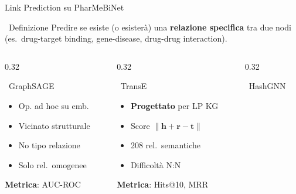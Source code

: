 \documentclass[aspectratio=169]{beamer}
\newcommand{\icoLink}{\faLink}
\newcommand{\icoCheck}{\faCheckCircle}
\newcommand{\icoX}{\faTimesCircle}
\newcommand{\icoLink}{\ding{212}}
\newcommand{\icoCheck}{\ding{52}}
\newcommand{\icoX}{\ding{56}}
\newcommand{\pro}{{\color{successGreen}\icoCheck}}
\newcommand{\con}{{\color{warningRed}\icoX}}
\newcommand{\neu}{{\color{unigold}$\sim$}}
\begin{document}
\begin{frame}{Link Prediction su PharMeBiNet}
  \begin{block}{\icoLink\ Definizione}
    \small
    Predire se esiste (o esister\`a) una \textbf{relazione specifica} tra due nodi
    (es.\ drug-target binding, gene-disease, drug-drug interaction).
  \end{block}
  \vspace{0.1cm}
  \begin{columns}[T]
    \begin{column}{0.32\textwidth}
      \begin{block}{\color{graphsageBlue}\icoLink\ GraphSAGE}
        \footnotesize
        \begin{itemize}
          \setlength{\itemsep}{1pt}
          \item[\neu] Op. ad hoc su emb.
          \item[\pro] Vicinato strutturale
          \item[\con] No tipo relazione
          \item[\neu] Solo rel.\ omogenee
        \end{itemize}
        \vspace{2pt}
        {\scriptsize\textbf{Metrica}: AUC-ROC}
      \end{block}
    \end{column}
    \begin{column}{0.32\textwidth}
      \begin{block}{\color{transeGreen}\icoLink\ TransE}
        \footnotesize
        \begin{itemize}
          \setlength{\itemsep}{1pt}
          \item[\pro] \textbf{Progettato} per LP KG
          \item[\pro] Score $\|\mathbf{h}{+}\mathbf{r}{-}\mathbf{t}\|$
          \item[\pro] 208 rel.\ semantiche
          \item[\con] Difficolt\`a N:N
        \end{itemize}
        \vspace{2pt}
        {\scriptsize\textbf{Metrica}: Hits@10, MRR}
      \end{block}
    \end{column}
    \begin{column}{0.32\textwidth}
      \begin{block}{\color{hashgnnPurple}\icoLink\ HashGNN}
        \footnotesize
        \begin{itemize}

\end{itemize}
\end{block}
\end{column}
\end{columns}
\end{frame}
\end{document}
